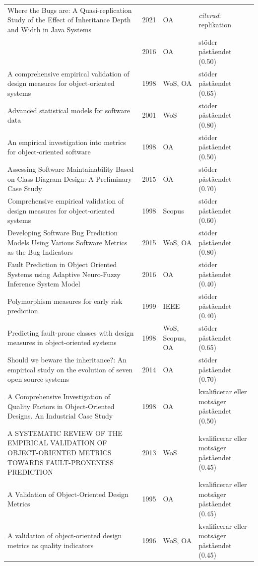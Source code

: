 \begin{longtable}{@{}%
  >{\raggedright\arraybackslash}p{}c%
  >{\raggedright\arraybackslash}p{}%
  >{\raggedright\arraybackslash}p{}@{}}
Where the Bugs are: A Quasi-replication Study of the Effect of Inheritance Depth and Width in Java Systems & 2021 & OA & \emph{citerad}: replikation \\
 & 2016 & OA & stöder påståendet (0.50) \\
A comprehensive empirical validation of design measures for object-oriented systems & 1998 & WoS, OA & stöder påståendet (0.65) \\
Advanced statistical models for software data & 2001 & WoS & stöder påståendet (0.80) \\
An empirical investigation into metrics for object-oriented software & 1998 & OA & stöder påståendet (0.50) \\
Assessing Software Maintainability Based on Class Diagram Design: A Preliminary Case Study & 2015 & OA & stöder påståendet (0.70) \\
Comprehensive empirical validation of design measures for object-oriented systems & 1998 & Scopus & stöder påståendet (0.60) \\
Developing Software Bug Prediction Models Using Various Software Metrics as the Bug Indicators & 2015 & WoS, OA & stöder påståendet (0.80) \\
Fault Prediction in Object Oriented Systems using Adaptive Neuro-Fuzzy Inference System Model & 2016 & OA & stöder påståendet (0.40) \\
Polymorphism measures for early risk prediction & 1999 & IEEE & stöder påståendet (0.40) \\
Predicting fault-prone classes with design measures in object-oriented systems & 1998 & WoS, Scopus, OA & stöder påståendet (0.65) \\
Should we beware the inheritance?: An empirical study on the evolution of seven open source systems & 2014 & OA & stöder påståendet (0.70) \\
A Comprehensive Investigation of Quality Factors in Object-Oriented Designs. An Industrial Case Study & 1998 & OA & kvalificerar eller motsäger påståendet (0.50) \\
A SYSTEMATIC REVIEW OF THE EMPIRICAL VALIDATION OF OBJECT-ORIENTED METRICS TOWARDS FAULT-PRONENESS PREDICTION & 2013 & WoS & kvalificerar eller motsäger påståendet (0.45) \\
A Validation of Object-Oriented Design Metrics & 1995 & OA & kvalificerar eller motsäger påståendet (0.45) \\
A validation of object-oriented design metrics as quality indicators & 1996 & WoS, OA & kvalificerar eller motsäger påståendet (0.45) \\

\end{longtable}
